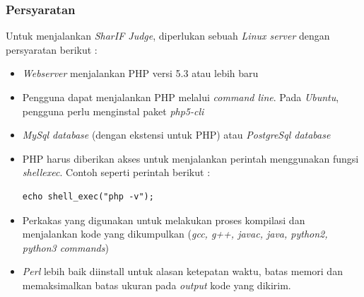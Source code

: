 \documentclass[a4paper,twoside]{article}
\begin{document}
\begin{enumerate}
		\subsubsection*{Persyaratan}
		\label{subsubsec:persyaratan}
		Untuk menjalankan \textit{SharIF Judge}, diperlukan sebuah \textit{Linux server} dengan persyaratan berikut :
		\begin{itemize}
			\item \textit{Webserver} menjalankan PHP versi 5.3 atau lebih baru
			\item Pengguna dapat menjalankan PHP melalui \textit{command line}. Pada \textit{Ubuntu}, pengguna perlu menginstal paket \textit{php5-cli}
			\item \textit{MySql database} (dengan ekstensi untuk PHP) atau \textit{PostgreSql database}
			\item PHP harus diberikan akses untuk menjalankan perintah menggunakan fungsi \textit{shell\textunderscore exec}. Contoh seperti perintah berikut :
			\begin{lstlisting}[basicstyle=\ttfamily, frame=single,
			columns=fullflexible, keepspaces=true, breaklines=true, label=ls:1]
echo shell_exec("php -v");
			\end{lstlisting}
			\item Perkakas yang digunakan untuk melakukan proses kompilasi dan menjalankan kode yang dikumpulkan (\textit{gcc, g++, javac, java, python2, python3 commands})
			\item \textit{Perl} lebih baik diinstall untuk alasan ketepatan waktu, batas memori dan memaksimalkan batas ukuran pada \textit{output} kode yang dikirim.
		\end{itemize}
		

\end{enumerate}
\end{document}
